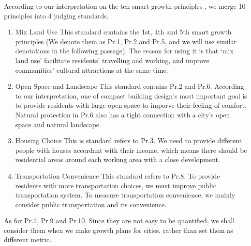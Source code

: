 According to our interpretation on the ten smart growth principles \cite{pdf:smart-growth}, we merge 10 principles into 4 judging standards.
\begin{enumerate}
  \item Mix Land Use
  This standard contains the 1st, 4th and 5th smart growth principles (We denote them as Pr.1, Pr.2 and Pr.5, and we will use similar denotations in the following passage). The reason for using it is that `mix land use' facilitate residents' travelling and working, and improve communities' cultural attractions at the same time.
  \item Open Space and Landscape
  This standard contains Pr.2 and Pr.6. According to our interpretation, one of compact building design's most important goal is to provide residents with large open space to imporve their feeling of comfort. Natural protection in Pr.6 also has a tight connection with a city's open space and natural landscape.
  \item Housing Choice
  This is standard refers to Pr.3. We need to provide different people with houses accordant with their income, which means there should be residential areas around each working area with a close development.
  \item Transportation Convenience
  This standard refers to Pr.8. To provide residents with more transportation choices, we must improve public transportation system. To measure transportation convenience, we mainly consider public transportation and its convenience.
\end{enumerate}
As for Pr.7, Pr.9 and Pr.10. Since they are not easy to be quantified, we shall consider them when we make growth plans for cities, rather than set them as different metric.

